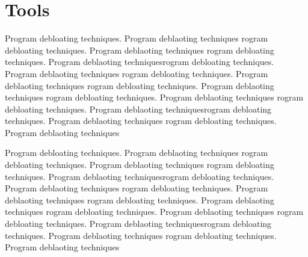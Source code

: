 \documentclass{relatorio}
\begin{document}
\section{Tools}%
\label{Tools}

Program debloating techniques. Program deblaoting techniques rogram debloating techniques. Program deblaoting techniques
rogram debloating techniques. Program deblaoting techniquesrogram debloating techniques. Program deblaoting techniques
rogram debloating techniques. Program deblaoting techniques rogram debloating techniques. Program deblaoting techniques
rogram debloating techniques. Program deblaoting techniques 
rogram debloating techniques. Program deblaoting techniquesrogram debloating techniques. Program deblaoting techniques
rogram debloating techniques. Program deblaoting techniques

Program debloating techniques. Program deblaoting techniques rogram debloating techniques. Program deblaoting techniques
rogram debloating techniques. Program deblaoting techniquesrogram debloating techniques. Program deblaoting techniques
rogram debloating techniques. Program deblaoting techniques rogram debloating techniques. Program deblaoting techniques
rogram debloating techniques. Program deblaoting techniques 
rogram debloating techniques. Program deblaoting techniquesrogram debloating techniques. Program deblaoting techniques
rogram debloating techniques. Program deblaoting techniques
\printbibliography{}
\end{document}
